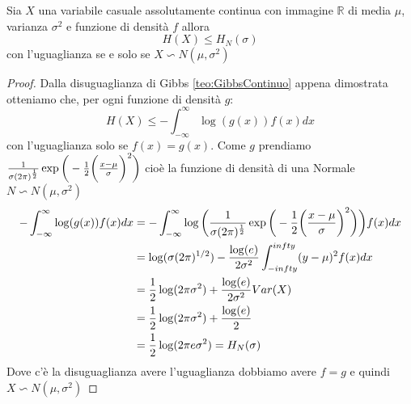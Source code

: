 \begin{teo}
Sia $X$ una variabile casuale assolutamente continua con immagine $\mathbb{R}$ di media $\mu$, varianza $\sigma^2$ e funzione di densità $f$ allora
$$H(X) \leq H_N(\sigma)$$
con l'uguaglianza se e solo se $X\backsim N(\mu,\sigma^2)$
\end{teo}
\begin{proof}
Dalla disuguaglianza di Gibbs \ref{teo:GibbsContinuo} appena dimostrata otteniamo che, per ogni funzione di densità $g$:
$$H(X)\leq - \int_{-\infty}^\infty \log (g(x))f(x)dx$$
con l'uguaglianza solo se $f(x)=g(x)$.
Come $g$ prendiamo $\frac{1}{\sigma (2\pi)^{\frac{1}{2}}} \exp \bigg( - \frac{1}{2} \bigg( \frac{x-\mu}{ \sigma} \bigg)^2 \bigg)$ cioè la funzione di densità di una Normale $N\backsim N(\mu, \sigma^2)$
\[
\begin{split}
- \int_{-\infty}^\infty \log (g(x))f(x)dx &= - \int_{-\infty}^\infty \log \bigg( \frac{1}{\sigma (2\pi)^{\frac{1}{2}}} \exp \bigg( - \frac{1}{2} \bigg( \frac{x-\mu}{ \sigma} \bigg)^2 \bigg)\bigg)f(x)dx\\
&= \log(\sigma(2\pi)^{1/2})- \frac{\log(e)}{2\sigma^2}\int_{-infty}^{infty} (y-\mu)^2f(x)dx \\
&= \frac{1}{2} \log(2\pi \sigma^2)+ \frac{ \log(e)}{2\sigma^2} Var(X)\\
&=\frac{1}{2} \log(2\pi \sigma^2)+ \frac{ \log(e)}{2}\\
&=\frac{1}{2} \log(2\pi e \sigma^2)=H_N(\sigma)
\end{split}
\]
Dove c'è la disuguaglianza avere l'uguaglianza dobbiamo avere $f=g$ e quindi $X\backsim N(\mu,\sigma^2)$
\end{proof}









